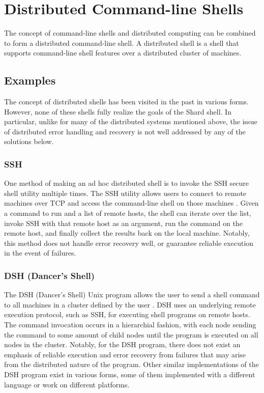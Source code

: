 \documentclass[twoside]{report}
\begin{document}
\section{Distributed Command-line Shells}
The concept of command-line shells and distributed computing can be combined to form a distributed command-line shell.
A distributed shell is a shell that supports command-line shell features over a distributed cluster of machines.

\subsection{Examples}
The concept of distributed shells has been visited in the past in various forms.
However, none of these shells fully realize the goals of the Shard shell.
In particular, unlike for many of the distributed systems mentioned above, the issue of distributed error handling and recovery is not well addressed by any of the solutions below.

\subsubsection{SSH}
One method of making an ad hoc distributed shell is to invoke the SSH secure shell utility multiple times.
The SSH utility allows users to connect to remote machines over TCP and access the command-line shell on those machines \cite{rfc4251}.
Given a command to run and a list of remote hosts, the shell can iterate over the list, invoke SSH with that remote host as an argument, run the command on the remote host, and finally collect the results back on the local machine.
Notably, this method does not handle error recovery well, or guarantee reliable execution in the event of failures.

\subsubsection{DSH (Dancer's Shell)}
The DSH (Dancer's Shell) Unix program allows the user to send a shell command to all machines in a cluster defined by the user \cite{dshdancer}.
DSH uses an underlying remote execution protocol, such as SSH, for executing shell programs on remote hosts.
The command invocation occurs in a hierarchial fashion, with each node sending the command to some amount of child nodes until the program is executed on all nodes in the cluster.
Notably, for the DSH program, there does not exist an emphasis of reliable execution and error recovery from failures that may arise from the distributed nature of the program.
Other similar implementations of the DSH program exist in various forms, some of them implemented with a different language or work on different platforms.
\end{document}
